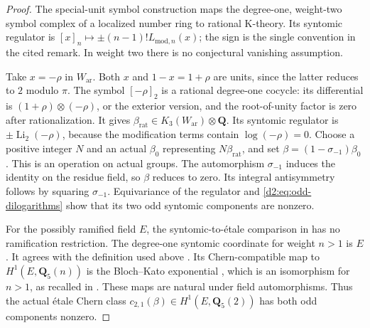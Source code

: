\documentclass[11pt,a4paper]{amsart}
\numberwithin{equation}{section}
\theoremstyle{definition}
\theoremstyle{remark}
\newcommand{\DtwoQQ}{\mathbf{Q}}
\newcommand{\Dtwoar}{\mathrm{ar}}
\DeclareMathOperator{\DtwoLi}{Li}
\begin{document}
\begin{proof}
The special-unit symbol construction
\cite[Theorems~1.6 and~1.10, Remark~1.7]{BesserDeJeu}
maps the degree-one, weight-two symbol complex of a localized
number ring to rational K-theory.
Its syntomic regulator is
\([x]_n\mapsto\pm(n-1)!L_{\mathrm{mod},n}(x)\);
the sign is the single convention in the cited remark.
In weight two there is no conjectural vanishing assumption.

Take \(x=-\rho\) in \(W_{\Dtwoar}\).
Both \(x\) and \(1-x=1+\rho\) are units, since the latter reduces
to \(2\) modulo \(\pi\).
The symbol \([-\rho]_2\) is a rational degree-one cocycle:
its differential is \((1+\rho)\otimes(-\rho)\), or the exterior
version, and the root-of-unity factor is zero after rationalization.
It gives \(\beta_{\mathrm{rat}}\in K_3(W_{\Dtwoar})\otimes\DtwoQQ\).
Its syntomic regulator is \(\pm\DtwoLi_2(-\rho)\), because the
modification terms contain \(\log(-\rho)=0\).
Choose a positive integer \(N\) and an actual \(\beta_0\)
representing \(N\beta_{\mathrm{rat}}\), and set
\(\beta=(1-\sigma_{-1})\beta_0\).
This is an operation on actual groups.
The automorphism \(\sigma_{-1}\) induces the identity on the residue
field, so \(\beta\) reduces to zero.
Its integral antisymmetry follows by squaring \(\sigma_{-1}\).
Equivariance of the regulator and
\eqref{d2:eq:odd-dilogarithms} show that its two odd syntomic
components are nonzero.

For the possibly ramified field \(E\), the syntomic-to-\'etale
comparison in \cite[Section~2]{HuberKings} has no ramification
restriction.
The degree-one syntomic coordinate for weight \(n>1\) is \(E\)
\cite[Example~2.2.4]{HuberKings}.
It agrees with the definition used above
\cite[Proposition~2.2.7]{HuberKings}.
Its Chern-compatible map to \(H^1(E,\DtwoQQ_5(n))\) is the
Bloch--Kato exponential
\cite[Propositions~2.2.9 and~2.3.4]{HuberKings}, which is an
isomorphism for \(n>1\), as recalled in
\cite[Section~1.3]{HuberKings}.
These maps are natural under field automorphisms.
Thus the actual \'etale Chern class
\(c_{2,1}(\beta)\in H^1(E,\DtwoQQ_5(2))\) has both odd components
nonzero.


\end{proof}
\end{document}
